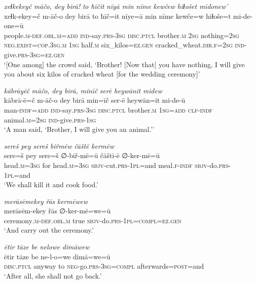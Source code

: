 \ea \label{ZP.118}
\textit{xeɫkekeyč māčo, dey birā! to ħīčit nīyā min nīme kewčew hiɫošet midonew’} \\ 
\gll xeɫk-ekey=č m-āč-o dey birā to ħīč=it nīye=ā min nīme kewče=w hiɫoše=t mi-de-one=ū \\ 
 people\textsc{.m}\textsc{-def}\textsc{.obl}\textsc{.m}\textsc{=add} \textsc{ind-}say\textsc{.prs}\textsc{-3sg} \textsc{disc.ptcl} brother\textsc{.m} \textsc{2sg} nothing\textsc{=\textsc{2sg}} \textsc{\textsc{neg.}exist}\textsc{=cop}\textsc{.3sg}\textsc{.m} \textsc{1sg} half\textsc{.m} six\_kilos\textsc{\textsc{=ez.gen}} cracked\_wheat\textsc{.dir}\textsc{.f}\textsc{=\textsc{2sg}} \textsc{ind-}give\textsc{.prs}\textsc{-3sg}\textsc{\textsc{=ez.gen}} \\ 
\glt `[One among] the crowd said, ‘Brother! [Now that] you have nothing, I will give you about six kilos of cracked wheat [for the wedding ceremony]'
\z 
 
\ea \label{ZP.121}
\textit{kābrāyēč māčo, dey birā, minīč serē heywānit midew} \\ 
\gll kābrā-ē=č m-āč-o dey birā min=īč ser-ē heywān=it mi-de-ū \\ 
 man\textsc{-indf}\textsc{=add} \textsc{ind-}say\textsc{.prs}\textsc{-3sg} \textsc{disc.ptcl} brother\textsc{.m} \textsc{1sg}\textsc{=add} \textsc{clf}\textsc{-indf} animal\textsc{.m}\textsc{=\textsc{2sg}} \textsc{ind-}give\textsc{.prs}\textsc{-\textsc{1sg}} \\ 
\glt `A man said, ‘Brother, I will give you an animal.’'
\z 
 
\ea \label{ZP.122}
\textit{sereš pey sereš biřmēw čāštē kermēw} \\ 
\gll sere=š pey sere=š ∅-biř-mē=ū čāštī-ē ∅-ker-mē=ū \\ 
 head\textsc{.m}\textsc{=3sg} for head\textsc{.m}\textsc{=3sg} \textsc{sbjv-}cut\textsc{.prs}\textsc{-1pl}=and meal\textsc{.f}\textsc{-indf} \textsc{sbjv-}do\textsc{.prs}\textsc{-1pl}=and \\ 
\glt `We shall kill it and cook food.'
\z 
 
\ea \label{ZP.123}
\textit{merāsēmekey řās kermēwew} \\ 
\gll merāsēm-ekey řās ∅-ker-mē=we=ū \\ 
 ceremony\textsc{.m}\textsc{-def}\textsc{.obl}\textsc{.m} true \textsc{sbjv-}do\textsc{.prs}\textsc{-1pl}\textsc{=compl}\textsc{\textsc{=ez.gen}} \\ 
\glt `And carry out the ceremony.'
\z 
 
\ea \label{ZP.124}
\textit{ētir tāze be nelowe dimāwew} \\ 
\gll ētir tāze be ne-l-o=we dimā=we=ū \\ 
 \textsc{disc.ptcl} anyway to \textsc{neg-}go\textsc{.prs}\textsc{-3sg}\textsc{=compl} afterwards\textsc{=\textsc{post}}=and \\ 
\glt `After all, she shall not go back.'
\z 
 
